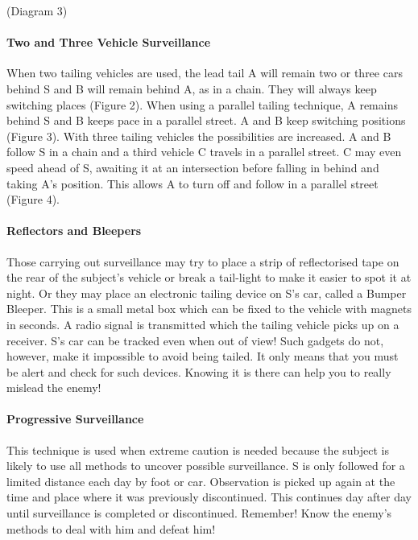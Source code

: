 (Diagram 3)

\paragraph{Two and Three Vehicle Surveillance}

When two tailing vehicles are used, the lead tail A will remain two or
three cars behind S and B will remain behind A, as in a chain. They will
always keep switching places (Figure 2). When using a parallel tailing
technique, A remains behind S and B keeps pace in a parallel street. A
and B keep switching positions (Figure 3). With three tailing vehicles
the possibilities are increased. A and B follow S in a chain and a third
vehicle C travels in a parallel street. C may even speed ahead of S,
awaiting it at an intersection before falling in behind and taking A's
position. This allows A to turn off and follow in a parallel street
(Figure 4).

\paragraph{Reflectors and Bleepers}

Those carrying out surveillance may try to place a strip of
reflectorised tape on the rear of the subject's vehicle or break a
tail-light to make it easier to spot it at night. Or they may place an
electronic tailing device on S's car, called a Bumper Bleeper. This is a
small metal box which can be fixed to the vehicle with magnets in
seconds. A radio signal is transmitted which the tailing vehicle picks
up on a receiver. S's car can be tracked even when out of view! Such
gadgets do not, however, make it impossible to avoid being tailed. It
only means that you must be alert and check for such devices. Knowing it
is there can help you to really mislead the enemy!

\paragraph{Progressive Surveillance}

This technique is used when extreme caution is needed because the
subject is likely to use all methods to uncover possible surveillance. S
is only followed for a limited distance each day by foot or car.
Observation is picked up again at the time and place where it was
previously discontinued. This continues day after day until surveillance
is completed or discontinued. Remember! Know the enemy's methods to deal
with him and defeat him!

